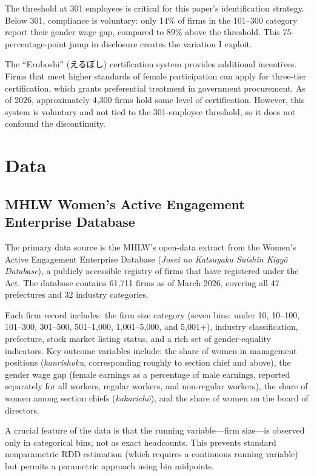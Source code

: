 \documentclass[12pt]{article}
\begin{document}
The threshold at 301 employees is critical for this paper's identification strategy. Below 301, compliance is voluntary: only 14\% of firms in the 101--300 category report their gender wage gap, compared to 89\% above the threshold. This 75-percentage-point jump in disclosure creates the variation I exploit.

The ``Eruboshi'' (えるぼし) certification system provides additional incentives. Firms that meet higher standards of female participation can apply for three-tier certification, which grants preferential treatment in government procurement. As of 2026, approximately 4,300 firms hold some level of certification. However, this system is voluntary and not tied to the 301-employee threshold, so it does not confound the discontinuity.


\section{Data}
\label{sec:data}

\subsection{MHLW Women's Active Engagement Enterprise Database}

The primary data source is the MHLW's open-data extract from the Women's Active Engagement Enterprise Database (\textit{Josei no Katsuyaku Suishin Kigyō Database}), a publicly accessible registry of firms that have registered under the Act. The database contains 61,711 firms as of March 2026, covering all 47 prefectures and 32 industry categories.

Each firm record includes: the firm size category (seven bins: under 10, 10--100, 101--300, 301--500, 501--1,000, 1,001--5,000, and 5,001+), industry classification, prefecture, stock market listing status, and a rich set of gender-equality indicators. Key outcome variables include: the share of women in management positions (\textit{kanrishoku}, corresponding roughly to section chief and above), the gender wage gap (female earnings as a percentage of male earnings, reported separately for all workers, regular workers, and non-regular workers), the share of women among section chiefs (\textit{kakarichō}), and the share of women on the board of directors.

A crucial feature of the data is that the running variable---firm size---is observed only in categorical bins, not as exact headcounts. This prevents standard nonparametric RDD estimation (which requires a continuous running variable) but permits a parametric approach using bin midpoints.
\end{document}
